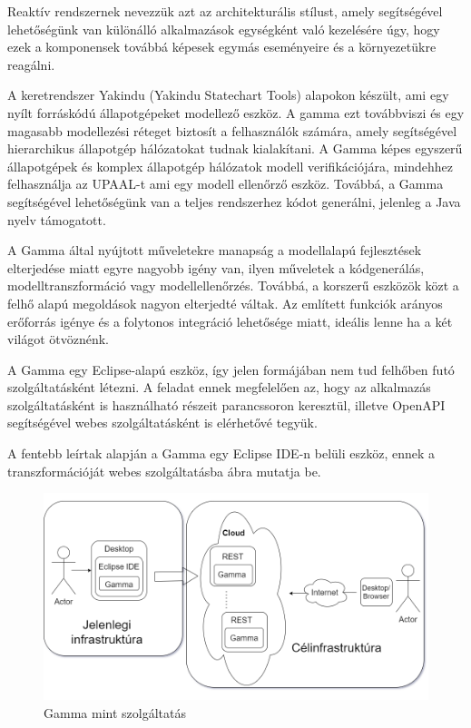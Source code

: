 Reaktív rendszernek nevezzük azt az architekturális stílust, amely segítségével lehetőségünk van különálló alkalmazások egységként való kezelésére úgy, hogy ezek a komponensek továbbá képesek egymás eseményeire és a környezetükre reagálni.

A keretrendszer Yakindu (Yakindu Statechart Tools) alapokon készült, ami egy nyílt forráskódú állapotgépeket modellező eszköz. A gamma ezt továbbviszi és egy magasabb modellezési réteget biztosít a felhasználók számára, amely segítségével hierarchikus állapotgép hálózatokat tudnak kialakítani. A Gamma képes egyszerű állapotgépek és komplex állapotgép hálózatok modell verifikációjára, mindehhez felhasználja az UPAAL-t ami egy modell ellenőrző eszköz. Továbbá, a Gamma segítségével lehetőségünk van a teljes rendszerhez kódot generálni, jelenleg a Java nyelv támogatott.


A Gamma által nyújtott műveletekre manapság a modellalapú fejlesztések elterjedése miatt egyre nagyobb igény van, ilyen műveletek a kódgenerálás, modelltranszformáció vagy modellellenőrzés. Továbbá, a korszerű eszközök közt a felhő alapú megoldások nagyon elterjedté váltak. Az említett funkciók arányos erőforrás igénye és a folytonos integráció lehetősége miatt, ideális lenne ha a két világot ötvöznénk.


A Gamma egy Eclipse-alapú eszköz, így jelen formájában nem tud felhőben futó szolgáltatásként létezni. A feladat ennek megfelelően az, hogy az alkalmazás szolgáltatásként is használható részeit parancssoron keresztül, illetve OpenAPI segítségével webes szolgáltatásként is elérhetővé tegyük.

A fentebb leírtak alapján a Gamma egy Eclipse IDE-n belüli eszköz, ennek a transzformációját webes szolgáltatásba  ábra mutatja be.

\begin{figure}[t]
	\centering
	\includegraphics[width=150mm, keepaspectratio]{figures/transformation.png}
	\caption{Gamma mint szolgáltatás}
	\label{fig:transformation}
\end{figure}


